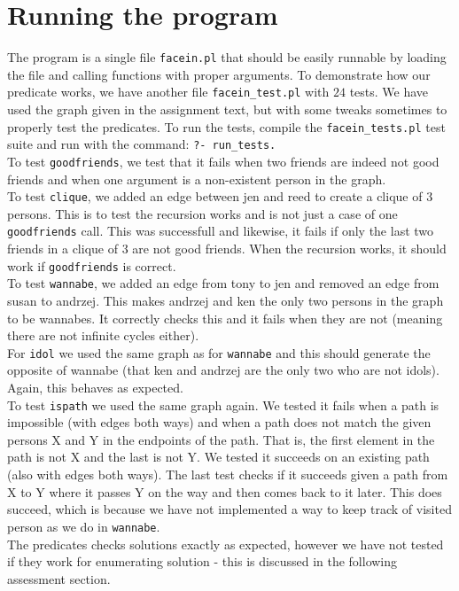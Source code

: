 \documentclass[a4paper]{article}
\begin{document}
\section*{Running the program}
The program is a single file \texttt{facein.pl} that should be easily runnable by loading the file and calling functions with proper arguments. To demonstrate how our predicate works, we have another file \texttt{facein\_test.pl} with $24$ tests. We have used the graph given in the assignment text, but with some tweaks sometimes to properly test the predicates. To run the tests, compile the \texttt{facein\_tests.pl} test suite and run with the command: \texttt{?- run\_tests.}\\
To test \texttt{goodfriends}, we test that it fails when two friends are indeed not good friends and when one argument is a non-existent person in the graph. \\
To test \texttt{clique}, we added an edge between jen and reed to create a clique of $3$ persons. This is to test the recursion works and is not just a  case of one \texttt{goodfriends} call. This was successfull and likewise, it fails if only the last two friends in a clique of $3$ are not good friends. When the recursion works, it should work if \texttt{goodfriends} is correct. \\
To test \texttt{wannabe}, we added an edge from tony to jen and removed an edge from susan to andrzej. This makes andrzej and ken the only two persons in the graph to be wannabes. It correctly checks this and it fails when they are not (meaning there are not infinite cycles either). \\
For \texttt{idol} we used the same graph as for \texttt{wannabe} and this should generate the opposite of wannabe (that ken and andrzej are the only two who are not idols). Again, this behaves as expected. \\
To test \texttt{ispath} we used the same graph again. We tested it fails when a path is impossible (with edges both ways) and when a path does not match the given persons X and Y in the endpoints of the path. That is, the first element in the path is not X and the last is not Y. We tested it succeeds on an existing path (also with edges both ways). The last test checks if it succeeds given a path from X to Y where it passes Y on the way and then comes back to it later. This does succeed, which is because we have not implemented a way to keep track of visited person as we do in \texttt{wannabe}. \\
The predicates checks solutions exactly as expected, however we have not tested if they work for enumerating solution - this is discussed in the following assessment section.
\end{document}
